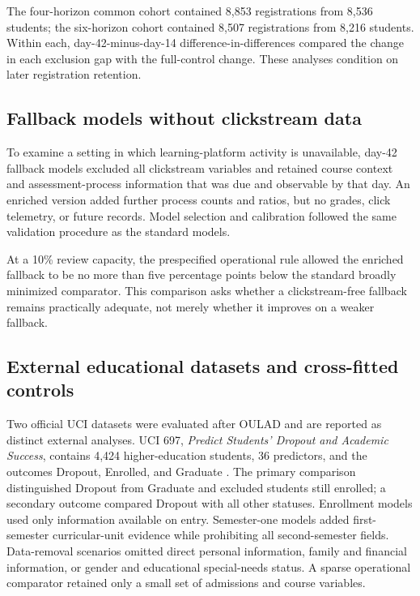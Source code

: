 \documentclass[education,article,submit,moreauthors]{Definitions/mdpi}
\begin{document}
The four-horizon common cohort contained 8,853 registrations from 8,536 students; the six-horizon cohort contained 8,507 registrations from 8,216 students. Within each, day-42-minus-day-14 difference-in-differences compared the change in each exclusion gap with the full-control change. These analyses condition on later registration retention.

\subsection{Fallback models without clickstream data}

To examine a setting in which learning-platform activity is unavailable, day-42 fallback models excluded all clickstream variables and retained course context and assessment-process information that was due and observable by that day. An enriched version added further process counts and ratios, but no grades, click telemetry, or future records. Model selection and calibration followed the same validation procedure as the standard models.

At a 10\% review capacity, the prespecified operational rule allowed the enriched fallback to be no more than five percentage points below the standard broadly minimized comparator. This comparison asks whether a clickstream-free fallback remains practically adequate, not merely whether it improves on a weaker fallback.

\subsection{External educational datasets and cross-fitted controls}

Two official UCI datasets were evaluated after OULAD and are reported as distinct external analyses. UCI 697, \emph{Predict Students' Dropout and Academic Success}, contains 4,424 higher-education students, 36 predictors, and the outcomes Dropout, Enrolled, and Graduate \citep{realinho2021uci697}. The primary comparison distinguished Dropout from Graduate and excluded students still enrolled; a secondary outcome compared Dropout with all other statuses. Enrollment models used only information available on entry. Semester-one models added first-semester curricular-unit evidence while prohibiting all second-semester fields. Data-removal scenarios omitted direct personal information, family and financial information, or gender and educational special-needs status. A sparse operational comparator retained only a small set of admissions and course variables.
\end{document}
